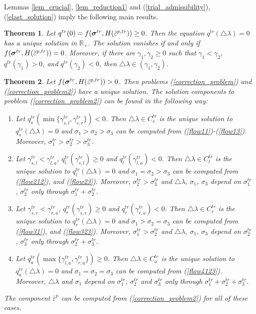 \documentclass[a4paper,12pt]{article}
\newtheorem{theorem}{Theorem}[section]
\theoremstyle{remark}
\newcommand{\mbf}[1]{\mbox{\boldmath$#1$}}
\numberwithin{equation}{section}
\begin{document}
Lemmas \ref{lem_crucial}, \ref{lem_reduction1} and (\ref{trial_admissibility}), (\ref{elast_solution}) imply the following main results.

\begin{theorem}
Let $q^{tr}(0)=f(\mbf{\sigma}^{tr},H(\bar{\varepsilon}^{p,tr}))\geq 0$. Then the equation $q^{tr}(\triangle\lambda)=0$ has a unique solution in $\mathbb R_+$. The solution vanishes if and only if $f(\mbf{\sigma}^{tr},H(\bar{\varepsilon}^{p,tr}))=0$. Moreover, if there are $\gamma_1,\gamma_2\geq0$ such that $\gamma_1<\gamma_2$, $q^{tr}(\gamma_1)>0$, and $q^{tr}(\gamma_2)<0$, then $\triangle\lambda\in(\gamma_1,\gamma_2)$. 
\end{theorem}

\begin{theorem}
Let $f(\mbf{\sigma}^{tr},H(\bar{\varepsilon}^{p,tr}))>0$. Then problems (\ref{correction_problem}) and (\ref{correction_problem2}) have a unique solution. The solution components to problem (\ref{correction_problem2}) can be found in the following way:
\begin{enumerate}
\item Let $q^{tr}_s(\min\{\gamma^{tr}_{s,l},\gamma^{tr}_{s,r}\})< 0$. Then $\triangle\lambda\in C^{tr}_s$ is the unique solution to $q^{tr}_s(\triangle\lambda)=0$ and $\sigma_1>\sigma_2>\sigma_3$ can be computed from  (\ref{flow11})-(\ref{flow13}). Moreover, $\sigma_1^{tr}>\sigma_2^{tr}>\sigma_3^{tr}$.
\item  Let $\gamma^{tr}_{s,l}<\gamma^{tr}_{l,a}$, $q^{tr}_l(\gamma^{tr}_{s,l})\geq 0$ and $q^{tr}_l(\gamma^{tr}_{l,a})< 0$. Then $\triangle\lambda\in C^{tr}_l$ is the unique solution to $q^{tr}_l(\triangle\lambda)=0$ and $\sigma_1=\sigma_2>\sigma_3$ can be computed from (\ref{flow212}),  and (\ref{flow23}). Moreover, $\sigma_2^{tr}>\sigma_3^{tr}$ and $\triangle\lambda$, $\sigma_1$, $\sigma_3$ depend on $\sigma^{tr}_1$, $\sigma^{tr}_2$ only through $\sigma^{tr}_1+\sigma^{tr}_2$.
\item Let $\gamma^{tr}_{s,r}<\gamma^{tr}_{r,a}$, $q^{tr}_r(\gamma^{tr}_{s,r})\geq 0$ and $q^{tr}_r(\gamma^{tr}_{r,a})< 0$. Then $\triangle\lambda\in C^{tr}_r$ is the unique solution to $q^{tr}_r(\triangle\lambda)=0$ and $\sigma_1>\sigma_2=\sigma_3$ can be computed from (\ref{flow31}),  and (\ref{flow323}). Moreover, $\sigma_1^{tr}>\sigma_2^{tr}$ and $\triangle\lambda$, $\sigma_1$, $\sigma_3$ depend on $\sigma^{tr}_2$, $\sigma^{tr}_3$ only through $\sigma^{tr}_2+\sigma^{tr}_3$.
\item  Let $q^{tr}_a(\max\{\gamma^{tr}_{l,a},\gamma^{tr}_{r,a}\})\geq 0$. Then $\triangle\lambda\in C^{tr}_a$ is the unique solution to $q^{tr}_a(\triangle\lambda)=0$ and $\sigma_1=\sigma_2=\sigma_3$ can be computed from (\ref{flow4123}). Moreover, $\triangle\lambda$ and $\sigma_1$  depend on $\sigma^{tr}_1$, $\sigma^{tr}_2$ and $\sigma^{tr}_3$ only through $\sigma^{tr}_1+\sigma^{tr}_2+\sigma^{tr}_3$.
\end{enumerate} 
The component $\bar{\varepsilon}^p$ can be computed from (\ref{correction_problem2}) for all of these cases.
\label{th_main}
\end{theorem}
\end{document}
